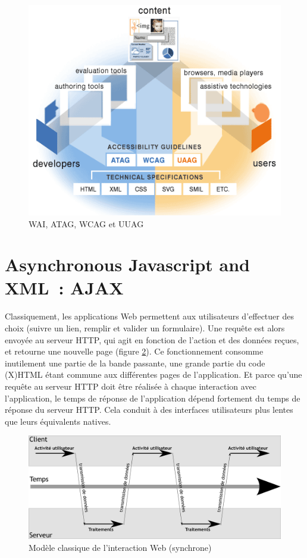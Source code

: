 \documentclass[
]{book}
\begin{document}
\begin{figure}
\centering
\includegraphics{img/specsWAI.png}
\caption{\label{fig:wai}WAI, ATAG, WCAG et UUAG}
\end{figure}

\hypertarget{ajax}{%
\section{Asynchronous Javascript and XML~: AJAX}\label{ajax}}

Classiquement, les applications Web permettent aux utilisateurs
d'effectuer des choix (suivre un lien, remplir et valider un formulaire). Une
requête est alors envoyée au serveur HTTP, qui agit en fonction de l'action
et des données reçues, et retourne une nouvelle page (figure \ref{fig:ajax1}).
Ce fonctionnement consomme inutilement une partie de la
bande passante, une grande partie du code (X)HTML étant commune aux
différentes pages de l'application. Et parce qu'une requête au serveur HTTP
doit être réalisée à chaque interaction avec l'application, le temps de
réponse de l'application dépend fortement du temps de réponse du serveur
HTTP. Cela conduit à des interfaces utilisateurs plus lentes que leurs
équivalents natives.

\begin{figure}
\centering
\includegraphics{img/ajax1.png}
\caption{\label{fig:ajax1}Modèle classique de l'interaction Web (synchrone)}
\end{figure}
\end{document}
